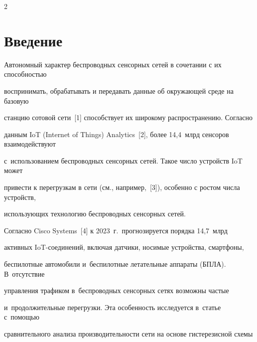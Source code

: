 




\thispagestyle{headings}





\begin{multicols}{2}





\label{st\stat}


  


\section{Введение}





  Автономный характер беспроводных сенсорных сетей  в сочетании с их способностью 


воспринимать, обрабатывать и передавать данные об окружающей среде на базовую 


станцию сотовой сети~[1] способствует их широкому распространению. Согласно 


данным IoT (Internet of Things) Analytics~[2], более 14,4~млрд сенсоров взаимодействуют 


с~использованием беспроводных сенсорных сетей. Такое число устройств IoT может 


привести к перегрузкам в сети (см., например,~[3]), особенно с ростом числа устройств, 


использующих технологию беспроводных сенсорных сетей.


  


  Согласно Cisco Systems~[4] к 2023~г.\ прогнозируется порядка 14,7~млрд 


активных IoT-со\-еди\-не\-ний, включая датчики, носимые устройства, смартфоны, 


беспилотные автомобили и~беспилотные летательные аппараты (БПЛА). В~отсутствие 


управ\-ле\-ния трафиком в~беспроводных сенсорных сетях возможны частые 


и~продолжительные перегрузки. Эта особенность исследуется в~\mbox{статье} с~по\-мощью 


сравнительного анализа про\-из\-во\-ди\-тель\-ности сети на основе гистерезисной схемы 



\end{multicols}
